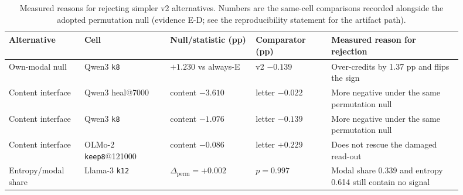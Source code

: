 \begin{table}[t]
\centering
\scriptsize
\setlength{\tabcolsep}{3.0pt}
\begin{tabular}{p{0.15\linewidth}p{0.17\linewidth}p{0.17\linewidth}p{0.15\linewidth}p{0.26\linewidth}}
\toprule
Alternative & Cell & Null/statistic (pp) & Comparator (pp) & Measured reason for rejection \\
\midrule
Own-modal null & Qwen3 \texttt{k8} & $+1.230$ vs always-E & v2 $-0.139$ & Over-credits by 1.37 pp and flips the sign \\
Content interface & Qwen3 heal@7000 & content $-3.610$ & letter $-0.022$ & More negative under the same permutation null \\
Content interface & Qwen3 \texttt{k8} & content $-1.076$ & letter $-0.139$ & More negative under the same permutation null \\
Content interface & OLMo-2 \texttt{keep8}@121000 & content $-0.086$ & letter $+0.229$ & Does not rescue the damaged read-out \\
Entropy/modal share & Llama-3 \texttt{k12} & $\Delta_{\mathrm{perm}}=+0.002$ & $p=0.997$ & Modal share 0.339 and entropy 0.614 still contain no signal \\
\bottomrule
\end{tabular}
\caption{Measured reasons for rejecting simpler v2 alternatives. Numbers are the same-cell comparisons recorded alongside the adopted permutation null (evidence \textsf{E-D}; see the reproducibility statement for the artifact path).}
\label{tab:v2-alternatives}
\end{table}
